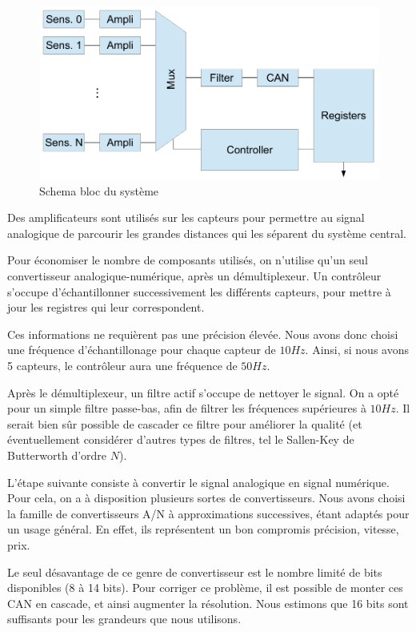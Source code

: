 \documentclass[a4paper]{article} %
\begin{document}
\begin{figure}[h!]
	\centering
	\includegraphics[scale=0.8]{sensor.pdf}
	\caption{Schema bloc du système}
\end{figure}

Des amplificateurs sont utilisés sur les capteurs pour permettre au signal analogique de parcourir les grandes distances qui les séparent du système central.

Pour économiser le nombre de composants utilisés, on n'utilise qu'un seul convertisseur analogique-numérique, après un démultiplexeur.
Un contrôleur s'occupe d'échantillonner successivement les différents capteurs, pour mettre à jour les registres qui leur correspondent.

Ces informations ne requièrent pas une précision élevée.
Nous avons donc choisi une fréquence d'échantillonage pour chaque capteur de $10 H\!z$.
Ainsi, si nous avons 5 capteurs, le contrôleur aura une fréquence de $50 H\!z$.

Après le démultiplexeur, un filtre actif s'occupe de nettoyer le signal.
On a opté pour un simple filtre passe-bas, afin de filtrer les fréquences supérieures à $10 H\!z$.
Il serait bien sûr possible de cascader ce filtre pour améliorer la qualité (et éventuellement considérer d'autres types de filtres, tel le Sallen-Key de Butterworth d'ordre $N$).

L'étape suivante consiste à convertir le signal analogique en signal numérique.
Pour cela, on a à disposition plusieurs sortes de convertisseurs.
Nous avons choisi la famille de convertisseurs A/N à approximations successives, étant adaptés pour un usage général.
En effet, ils représentent un bon compromis précision, vitesse, prix.

Le seul désavantage de ce genre de convertisseur est le nombre limité de bits disponibles (8 à 14 bits).
Pour corriger ce problème, il est possible de monter ces CAN en cascade, et ainsi augmenter la résolution.
Nous estimons que 16 bits sont suffisants pour les grandeurs que nous utilisons.
\end{document}

